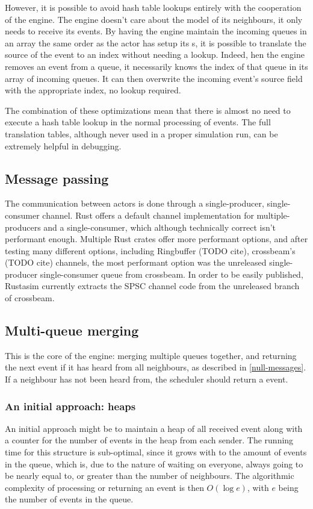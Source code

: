 However, it is possible to avoid hash table lookups entirely with the cooperation of the engine.
The engine doesn't care about the model  of its neighbours, it only needs to receive its events.
By having the engine maintain the incoming queues in an array the same order as the actor has setup its s, it is possible to translate the source  of the event to an index without needing a lookup.
Indeed, hen the engine removes an event from a queue, it necessarily knows the index of that queue in its array of incoming queues.
It can then overwrite the incoming event's source field with the appropriate index, no lookup required.


The combination of these optimizations mean that there is almost no need to execute a hash table lookup in the normal processing of events.
The full translation tables, although never used in a proper simulation run, can be extremely helpful in debugging.

\subsection{Message passing} \label{rustasim-message-passing}

The communication between actors is done through a single-producer, single-consumer channel.
Rust offers a default channel implementation for multiple-producers and a single-consumer, which although technically correct isn't performant enough.
Multiple Rust crates offer more performant options, and after testing many different options, including Ringbuffer (TODO cite), crossbeam's (TODO cite) channels, the most performant option was the unreleased single-producer single-consumer queue from crossbeam.
In order to be easily published, Rustasim currently extracts the SPSC channel code from the unreleased branch of crossbeam.

\subsection{Multi-queue merging} \label{rusatim-tree}

This is the core of the engine: merging multiple queues together, and returning the next event if it has heard from all neighbours, as described in \ref{null-messages}.
If a neighbour has not been heard from, the scheduler should return a  event.

\subsubsection{An initial approach: heaps}
An initial approach might be to maintain a heap of all received event along with a counter for the number of events in the heap from each sender.
The running time for this structure is sub-optimal, since it grows with to the amount of events in the queue, which is, due to the nature of waiting on everyone, always going to be nearly equal to, or greater than the number of neighbours.
The algorithmic complexity of processing or returning an event is then $O(\log e)$, with $e$ being the number of events in the queue.

